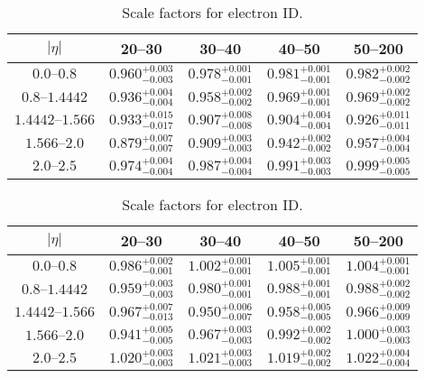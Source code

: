 \begin{table}[h]
\centering
\begin{center}
    \begin{tabular}{ | c | c | c | c | c |} \hline
	$|\eta|$                   & 20--30 \GeV               & 30--40 \GeV & 40--50 \GeV               & 50--200 \GeV \\ \hline
	$\numrange{0.0}{0.8}$      & $0.960_{-0.003}^{+0.003}$ & $0.978_{-0.001}^{+0.001}$ & $0.981_{-0.001}^{+0.001}$ & $0.982_{-0.002}^{+0.002}$ \\ \hline
	$\numrange{0.8}{1.4442}$   & $0.936_{-0.004}^{+0.004}$ & $0.958_{-0.002}^{+0.002}$ & $0.969_{-0.001}^{+0.001}$ & $0.969_{-0.002}^{+0.002}$ \\ \hline
	$\numrange{1.4442}{1.566}$ & $0.933_{-0.017}^{+0.015}$ & $0.907_{-0.008}^{+0.008}$ & $0.904_{-0.004}^{+0.004}$ & $0.926_{-0.011}^{+0.011}$ \\ \hline
	$\numrange{1.566}{2.0}$    & $0.879_{-0.007}^{+0.007}$ & $0.909_{-0.003}^{+0.003}$ & $0.942_{-0.002}^{+0.002}$ & $0.957_{-0.004}^{+0.004}$ \\ \hline
	$\numrange{2.0}{2.5}$      & $0.974_{-0.004}^{+0.004}$ & $0.987_{-0.004}^{+0.004}$ & $0.991_{-0.003}^{+0.003}$ & $0.999_{-0.005}^{+0.005}$ \\ \hline
    \end{tabular}
\end{center}
\caption{
    Scale factors for \EGTIGHT electron ID.
}
\label{table:tight_scale_factor}
\end{table}

\begin{table}[h]
\centering
\begin{center}
    \begin{tabular}{ | c | c | c | c | c |} \hline
	$|\eta|$                   & 20--30 \GeV               & 30--40 \GeV & 40--50 \GeV               & 50--200 \GeV \\ \hline
	$\numrange{0.0}{0.8}$      & $0.986_{-0.001}^{+0.002}$ & $1.002_{-0.001}^{+0.001}$ & $1.005_{-0.001}^{+0.001}$ & $1.004_{-0.001}^{+0.001}$ \\ \hline
	$\numrange{0.8}{1.4442}$   & $0.959_{-0.003}^{+0.003}$ & $0.980_{-0.001}^{+0.001}$ & $0.988_{-0.001}^{+0.001}$ & $0.988_{-0.002}^{+0.002}$ \\ \hline
	$\numrange{1.4442}{1.566}$ & $0.967_{-0.013}^{+0.007}$ & $0.950_{-0.007}^{+0.006}$ & $0.958_{-0.005}^{+0.005}$ & $0.966_{-0.009}^{+0.009}$ \\ \hline
	$\numrange{1.566}{2.0}$    & $0.941_{-0.005}^{+0.005}$ & $0.967_{-0.003}^{+0.003}$ & $0.992_{-0.002}^{+0.002}$ & $1.000_{-0.003}^{+0.003}$ \\ \hline
	$\numrange{2.0}{2.5}$      & $1.020_{-0.003}^{+0.003}$ & $1.021_{-0.003}^{+0.003}$ & $1.019_{-0.002}^{+0.002}$ & $1.022_{-0.004}^{+0.004}$ \\ \hline
    \end{tabular}
\end{center}
\centering
\caption{
    Scale factors for \EGMEDIUM electron ID.
}
\label{table:medium_scale_factor}
\end{table}

